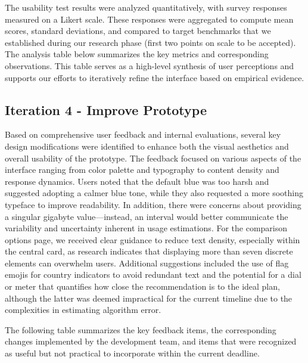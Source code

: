 \documentclass[conference]{IEEEtran}
\begin{document}
The usability test results were analyzed quantitatively, with survey responses measured on a Likert scale. These responses were aggregated to compute mean scores, standard deviations, and compared to target benchmarks that we established during our research phase (first two points on scale to be accepted). The analysis table below summarizes the key metrics and corresponding observations. This table serves as a high-level synthesis of user perceptions and supports our efforts to iteratively refine the interface based on empirical evidence.


\subsection{Iteration 4 - Improve Prototype}

Based on comprehensive user feedback and internal evaluations, several key design modifications were identified to enhance both the visual aesthetics and overall usability of the prototype. The feedback focused on various aspects of the interface ranging from color palette and typography to content density and response dynamics. Users noted that the default blue was too harsh and suggested adopting a calmer blue tone, while they also requested a more soothing typeface to improve readability. In addition, there were concerns about providing a singular gigabyte value—instead, an interval would better communicate the variability and uncertainty inherent in usage estimations. For the comparison options page, we received clear guidance to reduce text density, especially within the central card, as research indicates that displaying more than seven discrete elements can overwhelm users. Additional suggestions included the use of flag emojis for country indicators to avoid redundant text and the potential for a dial or meter that quantifies how close the recommendation is to the ideal plan, although the latter was deemed impractical for the current timeline due to the complexities in estimating algorithm error.

The following table summarizes the key feedback items, the corresponding changes implemented by the development team, and items that were recognized as useful but not practical to incorporate within the current deadline.
\end{document}
